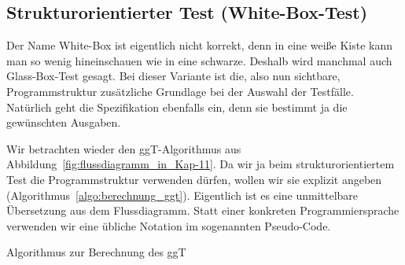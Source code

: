 \subsection{Strukturorientierter Test (White-Box-Test)}
\label{sec:Kap-11-1-5}

Der Name White-Box ist eigentlich nicht korrekt, denn in eine weiße Kiste kann man so wenig hineinschauen wie in eine schwarze. Deshalb wird manchmal auch Glass-Box-Test gesagt. Bei dieser Variante ist die, also nun sichtbare, Programmstruktur zusätzliche Grundlage bei der Auswahl der Testfälle. Natürlich geht die Spezifikation ebenfalls ein, denn sie bestimmt ja die gewünschten Ausgaben.

\vspace{2mm} %

Wir betrachten wieder den ggT-Algorithmus aus Abbildung~\ref{fig:flussdiagramm_in_Kap-11}. Da wir ja beim strukturorientiertem Test die Programmstruktur verwenden dürfen, wollen wir sie explizit angeben (Algorithmus~\ref{algo:berechnung_ggt}). Eigentlich ist es eine unmittelbare Übersetzung aus dem Flussdiagramm. Statt einer konkreten Programmiersprache verwenden wir eine übliche Notation im sogenannten Pseudo-Code.

\vspace{\baselineskip} %
\vspace{\baselineskip} %

\begin{algorithm}[H]
	\caption{Algorithmus zur Berechnung des ggT}
	\label{algo:berechnung_ggt}
	
	\vspace{2mm} %
	\vspace{\baselineskip}
	
	
	\vspace{2mm} %
	\vspace{\baselineskip}
	
	
	\vspace{2mm} %
	\vspace{\baselineskip}
	
	
	\vspace{2mm} %
	\vspace{\baselineskip}
\end{algorithm}

\vspace{\baselineskip} %
\vspace{\baselineskip} %
